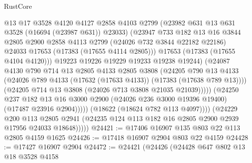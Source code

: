 \begin{lexlean}{RustCore}
\begin{coremodule}
                            @13
                            @17
                            @3528
                            @4120
                            @4127
                            @2858
                            @4103
                            @2799
                            (@23982 @631 @13 @631 @3528 (@16694 (@23987 @631)) @23033)
                            (@23947
                              @733
                              @182
                              @13
                              @16
                              @3844
                              @2805
                              @2900
                              @2858
                              @4113
                              @2799
                              (@24026 @732 @3844 @22182 @22186)
                              @24033
                              @17653
                              (@17383 (@17655 @4114 @2805)))
                            @17653
                            (@17383 (@17655 @4104 @4120)))
                          @19223
                          @19226
                          @19229
                          @19233
                          @19238
                          @19244)
                        (@24087
                          @4130
                          @790
                          @714
                          @13
                          @2805
                          @4133
                          @2805
                          @3808
                          (@24205
                            @790
                            @13
                            @4133
                            (@24026 @789 @4133 (@17632 (@17633 @4133)) (@17383 (@17638 @789 @13))))
                          (@24205 @714 @13 @3808 (@24026 @713 @3808 @21035 @21039)))))
                    (@24250
                      @237
                      @182
                      @13
                      @16
                      @3000
                      @2900
                      (@24026 @236 @3000 @19396 @19400)
                      (@17487 @23916 @2904)))))
              (@18622 (@18624 @782 @113 @4097))))
          (@24229
            @200
            @113
            @2805
            @2941
            (@24235 @124 @113 @182 @16 @2805 @2900 @2939 @17956 @24033 @18648)))))
@24421 := @17406 @16907 @135 @803 @22 @113 @2805 @4159 @1625
@24426 := @17418 @16907 @2904 @803 @22 @4159
@24428 := @17427 @16907 @2904
@24472 := @24421
    (@24426
      (@24428
        @647
        @802
        @13
        @18
        @3528
        @4158

\end{coremodule}
\end{lexlean}

